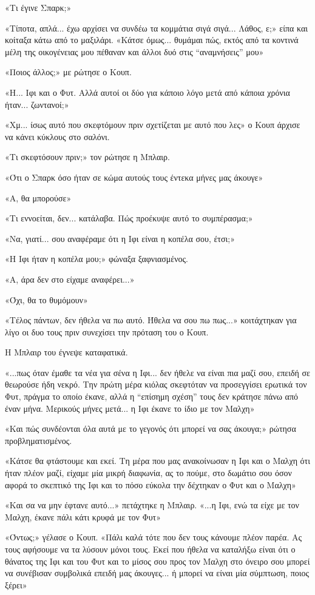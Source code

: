 \documentclass[12pt,twoside, openany]{book}
\begin{document}
«Τι έγινε Σπαρκ;»

«Τίποτα, απλά... έχω αρχίσει να συνδέω τα κομμάτια σιγά σιγά... Λάθος, ε;» είπα και κοίταξα κάτω από το μαξιλάρι. «Κάτσε όμως... θυμάμαι πώς, εκτός από τα κοντινά μέλη της οικογένειας μου πέθαναν και άλλοι δυό στις “αναμνήσεις” μου»

«Ποιος άλλος;» με ρώτησε ο Κουπ.

«Η... Ιφι και ο Φυτ. Αλλά αυτοί οι δύο για κάποιο λόγο μετά από κάποια χρόνια ήταν... ζωντανοί;»

«Χμ... ίσως αυτό που σκεφτόμουν πριν σχετίζεται με αυτό που λες» ο Κουπ άρχισε να κάνει κύκλους στο σαλόνι.

«Τι σκεφτόσουν πριν;» τον ρώτησε η Μπλαιρ.

«Ότι ο Σπαρκ όσο ήταν σε κώμα αυτούς τους έντεκα μήνες μας άκουγε»

«Α, θα μπορούσε»

«Τι εννοείται, δεν... κατάλαβα. Πώς προέκυψε αυτό το συμπέρασμα;»

«Να, γιατί... σου αναφέραμε ότι η Ιφι είναι η κοπέλα σου, έτσι;»

«Η Ιφι ήταν η κοπέλα μου;» φώναξα ξαφνιασμένος.

«Α, άρα δεν στο είχαμε αναφέρει...»

«Όχι, θα το θυμόμουν»

«Τέλος πάντων, δεν ήθελα να πω αυτό. Ήθελα να σου πω πως...» κοιτάχτηκαν για λίγο οι δυο τους πριν συνεχίσει την πρόταση του ο Κουπ.

Η Μπλαιρ του έγνεψε καταφατικά.

«...πως όταν έμαθε τα νέα για σένα η Ιφι... δεν ήθελε να είναι πια μαζί σου, επειδή σε θεωρούσε ήδη νεκρό. Την πρώτη μέρα κιόλας σκεφτόταν να προσεγγίσει ερωτικά τον Φυτ, πράγμα το οποίο έκανε, αλλά η “επίσημη σχέση” τους δεν κράτησε πάνω από έναν μήνα. Μερικούς μήνες μετά... η Ιφι έκανε το ίδιο με τον Μαλχη»

«Και πώς συνδέονται όλα αυτά με το γεγονός ότι μπορεί να σας άκουγα;» ρώτησα προβληματισμένος.

«Κάτσε θα φτάστουμε και εκεί. Τη μέρα που μας ανακοίνωσαν η Ιφι και ο Μαλχη ότι ήταν πλέον μαζί, είχαμε μία μικρή διαφωνία, ας το πούμε, στο δωμάτιο σου όσον αφορά το σκεπτικό της Ιφι και το πόσο εύκολα την δέχτηκαν ο Φυτ και ο Μαλχη»

«Και σα να μην έφτανε αυτό...» πετάχτηκε η Μπλαιρ. «...η Ιφι, ενώ τα είχε με τον Μαλχη, έκανε πάλι κάτι κρυφά με τον Φυτ»

«Όντως;» γέλασε ο Κουπ. «Πάλι καλά τότε που δεν τους κάνουμε πλέον παρέα. Ας τους αφήσουμε να τα λύσουν μόνοι τους. Εκεί που ήθελα να καταλήξω είναι ότι ο θάνατος της Ιφι και του Φυτ και το μίσος σου προς τον Μαλχη στο όνειρο σου μπορεί να συνέβισαν συμβολικά επειδή μας άκουγες... ή μπορεί να είναι μία σύμπτωση, ποιος ξέρει»
\end{document}
